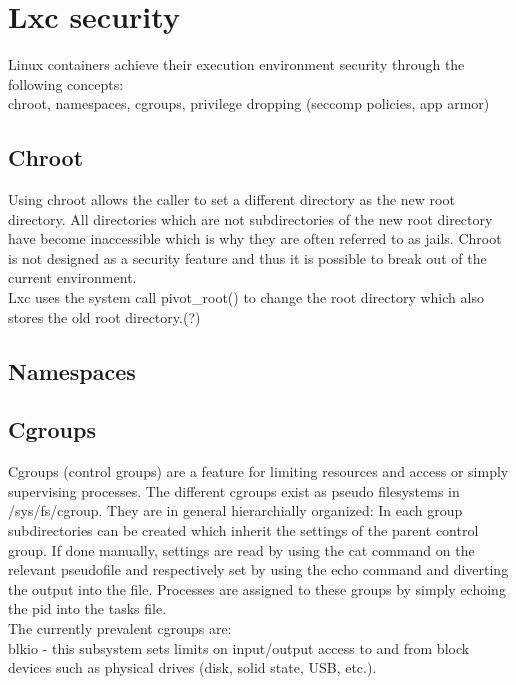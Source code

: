 \chapter{Lxc security}

Linux containers achieve their execution environment security through the following concepts:\\
chroot, namespaces, cgroups, privilege dropping (seccomp policies, app armor)\\

\section{Chroot}

Using chroot allows the caller to set a different directory as the new root directory. All directories which are not subdirectories
of the new root directory have become inaccessible which is why they are often referred to as jails. Chroot is not designed as a security
feature and thus it is possible to break out of the current environment.\\
Lxc uses the system call pivot_root() to change the root directory which also stores the old root directory.(?)

\section{Namespaces}

\section{Cgroups}

Cgroups (control groups) are a feature for limiting resources and access or simply supervising processes. The different cgroups exist as
pseudo filesystems in /sys/fs/cgroup. They are in general hierarchially organized: In each group subdirectories can be created
which inherit the settings of the parent control group. If done manually, settings are read by using the cat command on the relevant
pseudofile and respectively set by using the echo command and diverting the output into the file. Processes are assigned to these groups
by simply echoing the pid into the tasks file.\\
The currently prevalent cgroups are:\\
blkio - this subsystem sets limits on input/output access to and from block devices such as physical drives (disk, solid state, USB, etc.). 

